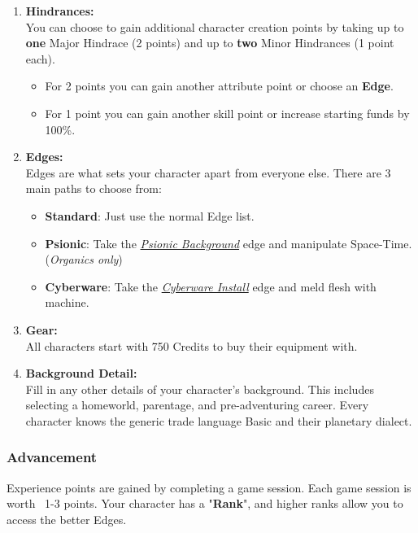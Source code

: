 \begin{enumerate}
  \item \textbf{Hindrances:}\\ You can choose to gain additional character creation points by taking up to \textbf{one} Major Hindrace (2 points) and up to \textbf{two} Minor Hindrances (1 point each).
    \begin{itemize}
        \item For 2 points you can gain another attribute point or choose an \textbf{Edge}.
        \item For 1 point you can gain another skill point or increase starting funds by 100\%.
    \end{itemize}

  \item \textbf{Edges:}\\ Edges are what sets your character apart from everyone else. There are 3 main paths to choose from:
    \begin{itemize}
        \item \textbf{Standard}: Just use the normal Edge list.
        \item \textbf{Psionic}: Take the \textit{\hyperref[sec:psionics]{Psionic Background}} edge and manipulate Space-Time. (\textit{Organics only})
        \item \textbf{Cyberware}: Take the \textit{\hyperref[sec:cyberware]{Cyberware Install}} edge and meld flesh with machine.
    \end{itemize}

  \item \textbf{Gear:}\\ All characters start with 750 Credits to buy their equipment with.

  \item \textbf{Background Detail:}\\ Fill in any other details of your character's background. This includes selecting a homeworld, parentage, and pre-adventuring career. Every character knows the generic trade language Basic and their planetary dialect.
  
\end{enumerate}

\subsubsection{Advancement}

Experience points are gained by completing a game session. Each game session is worth ~1-3 points. Your character has a "\textbf{Rank}", and higher ranks allow you to access the better Edges.

